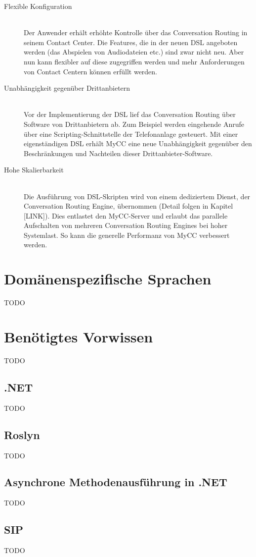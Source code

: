\begin{description}
\item[Flexible Konfiguration] \hfill \\
Der Anwender erhält erhöhte Kontrolle über das Conversation Routing in seinem Contact Center. Die Features, die in der neuen DSL angeboten werden (das Abspielen von Audiodateien etc.) sind zwar nicht neu. Aber nun kann flexibler auf diese zugegriffen werden und mehr Anforderungen von Contact Centern können erfüllt werden.
\item[Unabhängigkeit gegenüber Drittanbietern] \hfill \\
Vor der Implementierung der DSL lief das Conversation Routing über Software von Drittanbietern ab. Zum Beispiel werden eingehende Anrufe über eine Scripting-Schnittstelle der Telefonanlage gesteuert. Mit einer eigenständigen DSL erhält MyCC eine neue Unabhängigkeit gegenüber den Beschränkungen und Nachteilen dieser Drittanbieter-Software.
\item[Hohe Skalierbarkeit] \hfill \\
Die Ausführung von DSL-Skripten wird von einem dediziertem Dienst, der Conversation Routing Engine, übernommen (Detail folgen in Kapitel [LINK]). Dies entlastet den MyCC-Server und erlaubt das parallele Aufschalten von mehreren Conversation Routing Engines bei hoher Systemlast. So kann die generelle Performanz von MyCC verbessert werden.
\end{description}

\section{Domänenspezifische Sprachen}
TODO

\section{Benötigtes Vorwissen}
TODO

\subsection{.NET}
TODO 
 
\subsection{Roslyn}
TODO

\subsection{Asynchrone Methodenausführung in .NET}
TODO

\subsection{SIP}
TODO